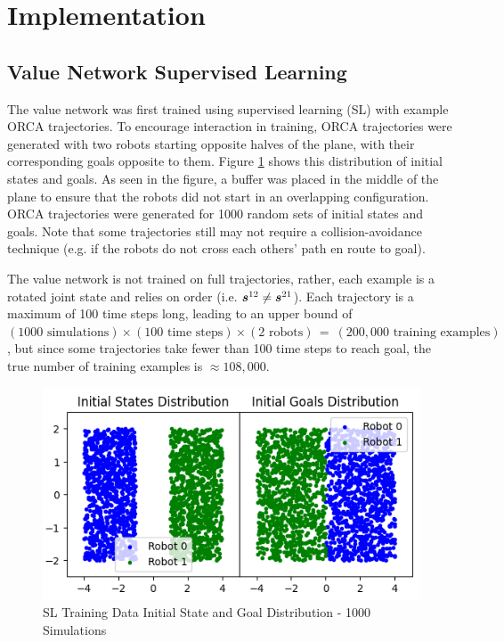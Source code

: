 \documentclass[conference]{IEEEtran}
\begin{document}
\section{Implementation}

\subsection{Value Network Supervised Learning}
The value network was first trained using supervised learning (SL) with example ORCA trajectories. To encourage interaction in training, ORCA trajectories were generated with two robots starting opposite halves of the plane, with their corresponding goals opposite to them. Figure \ref{fig:training_init} shows this distribution of initial states and goals. As seen in the figure, a buffer was placed in the middle of the plane to ensure that the robots did not start in an overlapping configuration. ORCA trajectories were generated for 1000 random sets of initial states and goals. Note that some trajectories still may not require a collision-avoidance technique (e.g. if the robots do not cross each others' path en route to goal).

The value network is not trained on full trajectories, rather, each example is a rotated joint state and relies on order (i.e. $\boldsymbol{s}^{12}_{}\neq\boldsymbol{s}^{21}_{}$). Each trajectory is a maximum of 100 time steps long, leading to an upper bound of $(1000 \text{ simulations})\times(100\text{ time steps})\times(2 \text{ robots}) \, = \ (200,000 \text{ training examples})$, but since some trajectories take fewer than 100 time steps to reach goal, the true number of training examples is $\approx108,000$.

\begin{figure}[h!]
    \centering
    \includegraphics[width=0.9\linewidth]{docs/latex/figures/training_data_distribution.png}
    \caption{SL Training Data Initial State and Goal Distribution - 1000 Simulations}
    \label{fig:training_init}
\end{figure}
\end{document}
